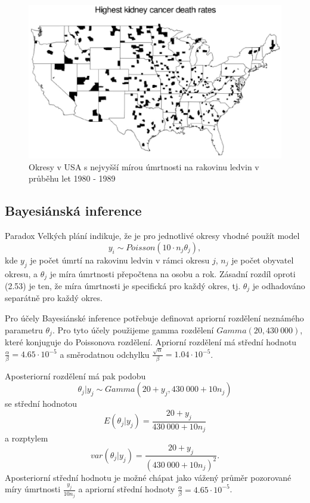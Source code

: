 \begin{figure}[htp]
\centering
\includegraphics[scale = 0.50]{pictures/fig_2_6.eps}
\caption{Okresy v USA s nejvyšší mírou úmrtnosti na rakovinu ledvin v průběhu let 1980 - 1989}
\label{fig_2_6}
\end{figure}

\subsection{Bayesiánská inference}

Paradox Velkých plání indikuje, že je pro jednotlivé okresy vhodné použít model
\begin{equation}
y_i \sim Poisson(10 \cdot n_j \theta_j),
\end{equation}
kde $y_j$ je počet úmrtí na rakovinu ledvin v rámci okresu $j$, $n_j$ je počet obyvatel okresu, a $\theta_j$ je míra úmrtnosti přepočtena na osobu a rok. Zásadní rozdíl oproti (2.53) je ten, že míra úmrtnosti je specifická pro každý okres, tj. $\theta_j$ je odhadováno separátně pro každý okres.

Pro účely Bayesiánské inference potřebuje definovat apriorní rozdělení neznámého parametru $\theta_j$. Pro tyto účely použijeme gamma rozdělení $Gamma(20, 430~000)$, které konjuguje do Poissonova rozdělení. Apriorní rozdělení má střední hodnotu $\frac{\alpha}{\beta} = 4.65 \cdot 10^{-5}$ a směrodatnou odchylku $\frac{\sqrt{\alpha}}{\beta} = 1.04 \cdot 10^{-5}$.

Aposteriorní rozdělení má pak podobu
\begin{equation}
\theta_j | y_j \sim \textit{Gamma}(20 + y_j, 430~000 + 10n_j)
\end{equation}
se střední hodnotou
\begin{equation}
E(\theta_j | y_j) = \frac{20 + y_j}{430~000 + 10 n_j}
\end{equation}
a rozptylem
\begin{equation}
var(\theta_j | y_j) = \frac{20 + y_j}{(430~000 + 10 n_j)^2}.
\end{equation}
Aposteriorní střední hodnotu je možné chápat jako vážený průměr pozorované míry úmrtnosti $\frac{y_j}{10 n_j}$ a apriorní střední hodnoty $\frac{\alpha}{\beta} = 4.65 \cdot 10^{-5}$.

